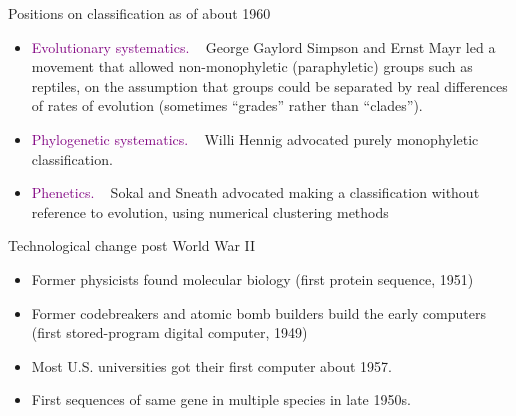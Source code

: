 \documentclass[bluish,slideColor,colorBG,pdf]{prosper}
\begin{document}
\begin{slide}[Replace]{Positions on classification as of about 1960}

\begin{itemize}
\item \textcolor{purple}{Evolutionary systematics.} ~ George Gaylord Simpson and Ernst Mayr
led a movement that allowed non-monophyletic (paraphyletic) groups such
as reptiles, on the assumption that groups could be separated by real
differences of rates of evolution (sometimes ``grades'' rather than ``clades''). 
\item \textcolor{purple}{Phylogenetic systematics.} ~ Willi Hennig advocated purely monophyletic
classification.
\item \textcolor{purple}{Phenetics.} ~ Sokal and Sneath advocated making a classification without
reference to evolution, using numerical clustering methods
\end{itemize}

\end{slide}

\begin{slide}[Replace]{Technological change post World War II}
\bigskip

\begin{itemize}
\item Former physicists found molecular biology (first protein sequence, 1951)
\item Former codebreakers and atomic bomb builders build the early
computers (first stored-program digital computer, 1949)
\item Most U.S. universities got their first computer about 1957.
\item First sequences of same gene in multiple species in late 1950s.
\end{itemize}



\end{slide}
\end{document}
